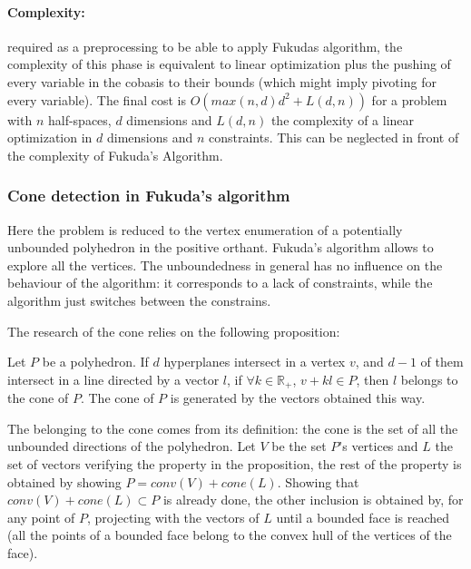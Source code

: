 \paragraph{Complexity:} required as a preprocessing to be able to apply Fukudas algorithm, the complexity of this phase is equivalent to linear optimization plus the pushing of every variable in the cobasis to their bounds (which might imply pivoting for every variable). The final cost is $O(max(n,d)d^2+L(d,n))$ for a problem with $n$ half-spaces, $d$ dimensions and $L(d,n)$ the complexity of a linear optimization in $d$ dimensions and $n$ constraints. This can be neglected in front of the complexity of Fukuda's Algorithm.

\subsubsection{Cone detection in Fukuda's algorithm}

Here the problem is reduced to the vertex enumeration of a potentially unbounded polyhedron in the positive orthant. Fukuda's algorithm allows to explore all the vertices. The unboundedness in general has no influence on the behaviour of the algorithm: it corresponds to a lack of constraints, while the algorithm just switches between the constrains.

The research of the cone relies on the following proposition:
\begin{proposition}
Let $P$ be a polyhedron. If $d$ hyperplanes intersect in a vertex $v$, and $d-1$ of them intersect in a line directed by a vector $l$, if $\forall k\in \mathbb{R}_+$, $v+kl\in P$, then $l$ belongs to the cone of $P$. The cone of $P$ is generated by the vectors obtained this way.
\label{prop_cone}
\end{proposition}

The belonging to the cone comes from its definition: the cone is the set of all the unbounded directions of the polyhedron. Let $V$ be the set $P$'s vertices and $L$ the set of vectors verifying the property in the proposition, the rest of the property is obtained by showing $P=conv(V)+cone(L)$. Showing that $conv(V)+cone(L)\subset P$ is already done, the other inclusion is obtained by, for any point of $P$, projecting with the vectors of $L$ until a bounded face is reached (all the points of a bounded face belong to the convex hull of the vertices of the face).

